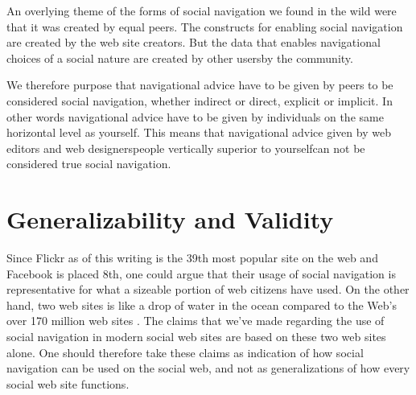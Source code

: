 An overlying theme of the forms of social navigation we found in the wild were
that it was created by equal peers. The constructs for enabling social
navigation are created by the web site creators. But the data that
enables navigational choices of a social nature are created by other
users\dash{}by the community.

We therefore purpose that navigational advice have to
be given by peers to be considered social navigation,
whether indirect or direct, explicit or implicit.
In other words
navigational advice have to be given by individuals on the same horizontal
level as yourself. This means that navigational advice given by web editors
and web designers\dash{}people vertically superior to yourself\dash{}can not
be considered true social navigation.

\section{Generalizability and Validity}

Since Flickr as of this writing is the 39th most popular site on the web
and Facebook is placed 8th,%
one could argue that their usage of social navigation is representative
for what a sizeable portion of web citizens have used. On the other hand, two
web sites is like a drop of water in the ocean compared to the Web's over
170 million web sites \citep{netcraft08}. The claims that we've made
regarding the use of social navigation in modern social web sites are based
on these two web sites alone. One should therefore take these claims
as indication of how social navigation can be used on the social web, and not
as generalizations of how every social web site functions.
